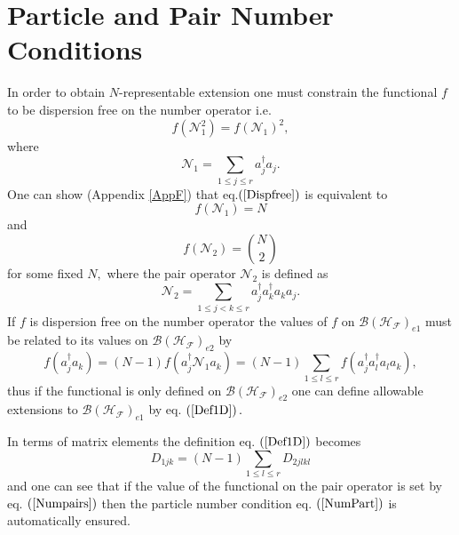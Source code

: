 \documentclass[aps,preprint]{revtex4}%
\begin{document}
\section{Particle and Pair Number Conditions \label{PartPair}}

In order to obtain $N$-representable extension one must constrain the
functional $f$ to be dispersion free on the number operator i.e.
\begin{equation}
f\left(  \mathcal{N}_{1}^{2}\right)  =f\left(  \mathcal{N}_{1}\right)
^{2},\label{Dispfree}%
\end{equation}
where
\begin{equation}
\mathcal{N}_{1}=\sum_{1\leq j\leq r}a_{j}^{\dagger}a_{j}.
\end{equation}
One can show (Appendix \ref{AppF}) that eq.$\left(  \ref{Dispfree}\right)  $
is equivalent to
\begin{equation}
f\left(  \mathcal{N}_{1}\right)  =N\label{NumPart}%
\end{equation}
and
\begin{equation}
f\left(  \mathcal{N}_{2}\right)  =\binom{N}{2}\label{Numpairs}%
\end{equation}
for some fixed $N,$ where the pair operator $\mathcal{N}_{2}$ is defined as
\begin{equation}
\mathcal{N}_{2}=\sum_{1\leq j<k\leq r}a_{j}^{\dagger}a_{k}^{\dagger}a_{k}%
a_{j}.
\end{equation}
If $f$ is dispersion free on the number operator the values of $f$ on
$\mathcal{B}\left(  \mathcal{H}_{\mathcal{F}}\right)  _{e1}$ must be related
to its values on $\mathcal{B}\left(  \mathcal{H}_{\mathcal{F}}\right)  _{e2}$
by
\begin{equation}
f\left(  a_{j}^{\dagger}a_{k}\right)  =\left(  N-1\right)  f\left(
a_{j}^{\dagger}\mathcal{N}_{1}a_{k}\right)  =\left(  N-1\right)  \sum_{1\leq
l\leq r}f\left(  a_{j}^{\dagger}a_{l}^{\dagger}a_{l}a_{k}\right)
,\label{Def1D}%
\end{equation}
thus if the functional is only defined on $\mathcal{B}\left(  \mathcal{H}%
_{\mathcal{F}}\right)  _{e2}$ one can define allowable extensions to
$\mathcal{B}\left(  \mathcal{H}_{\mathcal{F}}\right)  _{e1}$ by eq. $\left(
\ref{Def1D}\right)  .$

In terms of matrix elements the definition eq. $\left(  \ref{Def1D}\right)  $
becomes
\begin{equation}
D_{1jk}=\left(  N-1\right)  \sum_{1\leq l\leq r}D_{2jlkl}%
\end{equation}
and one can see that if the value of the functional on the pair operator is
set by eq. $\left(  \ref{Numpairs}\right)  $ then the particle number
condition eq. $\left(  \ref{NumPart}\right)  $ is automatically ensured.
\end{document}
